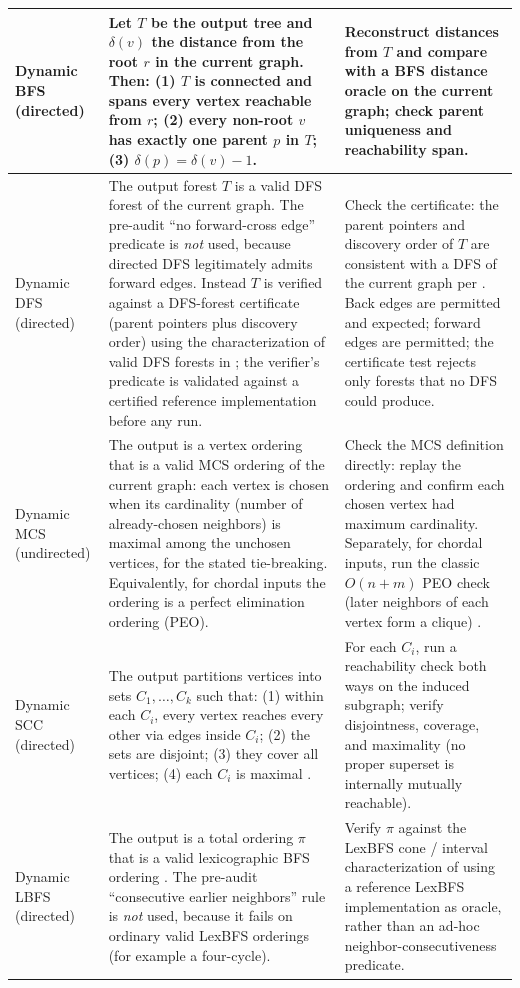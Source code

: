 \documentclass[12pt,a4paper]{article}
\begin{document}
\begin{longtable}{|p{2.6cm}|p{8.2cm}|p{3.6cm}|}
Dynamic BFS (directed) & Let $T$ be the output tree and $\delta(v)$ the distance from the root $r$ in the current graph. Then: (1) $T$ is connected and spans every vertex reachable from $r$; (2) every non-root $v$ has exactly one parent $p$ in $T$; (3) $\delta(p) = \delta(v) - 1$. & Reconstruct distances from $T$ and compare with a BFS distance oracle on the current graph; check parent uniqueness and reachability span. \\
\hline
Dynamic DFS (directed) & The output forest $T$ is a valid DFS forest of the current graph. The pre-audit ``no forward-cross edge'' predicate is \emph{not} used, because directed DFS legitimately admits forward edges. Instead $T$ is verified against a DFS-forest certificate (parent pointers plus discovery order) using the characterization of valid DFS forests in \cite{yang2019dynamic}; the verifier's predicate is validated against a certified reference implementation before any run. & Check the certificate: the parent pointers and discovery order of $T$ are consistent with a DFS of the current graph per \cite{yang2019dynamic}. Back edges are permitted and expected; forward edges are permitted; the certificate test rejects only forests that no DFS could produce. \\
\hline
Dynamic MCS (undirected) & The output is a vertex ordering that is a valid MCS ordering of the current graph: each vertex is chosen when its cardinality (number of already-chosen neighbors) is maximal among the unchosen vertices, for the stated tie-breaking. Equivalently, for chordal inputs the ordering is a perfect elimination ordering (PEO). & Check the MCS definition directly: replay the ordering and confirm each chosen vertex had maximum cardinality. Separately, for chordal inputs, run the classic $O(n+m)$ PEO check (later neighbors of each vertex form a clique) \cite{tarjan1984mcs,heggernes2006}. \\
\hline
Dynamic SCC (directed) & The output partitions vertices into sets $C_1, \ldots, C_k$ such that: (1) within each $C_i$, every vertex reaches every other via edges inside $C_i$; (2) the sets are disjoint; (3) they cover all vertices; (4) each $C_i$ is maximal \cite{karczmarz2024dynamic}. & For each $C_i$, run a reachability check both ways on the induced subgraph; verify disjointness, coverage, and maximality (no proper superset is internally mutually reachable). \\
\hline
Dynamic LBFS (directed) & The output is a total ordering $\pi$ that is a valid lexicographic BFS ordering \cite{rose1976algorithmic}. The pre-audit ``consecutive earlier neighbors'' rule is \emph{not} used, because it fails on ordinary valid LexBFS orderings (for example a four-cycle). & Verify $\pi$ against the LexBFS cone / interval characterization of \cite{rose1976algorithmic} using a reference LexBFS implementation as oracle, rather than an ad-hoc neighbor-consecutiveness predicate. \\

\end{longtable}
\end{document}
